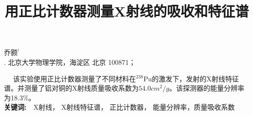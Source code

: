 \documentclass[a4paper,10.0pt,twoside]{npr}
\begin{document}
\setcounter{page}{001}%
\begin{center}
\title{%
\xiaoerhao \bf  %
用正比计数器测量X射线的吸收和特征谱\\[-5mm]}
\maketitle
\large \fs
乔颢$^{^1}$\\[2mm]

\xiaowu {}. 北京大学物理学院，海淀区 北京 100871；\\[4mm]

 

\parbox{158mm} {
~~\fs
该实验使用正比计数器测量了不同材料在$^{238}$Pu的激发下，发射的X射线特征谱。并测量了铝对铜的X射线质量吸收系数为$54.0cm^2/g$。该探测器的能量分辨率为18.3\%。\\

{\bf 关键词:}~~\fs X射线， X射线特征谱， 正比计数器， 能量分辨率，质量吸收系数}\\
\end{center}
\vspace{5mm}
\setcounter{section}{0}
\end{document}
